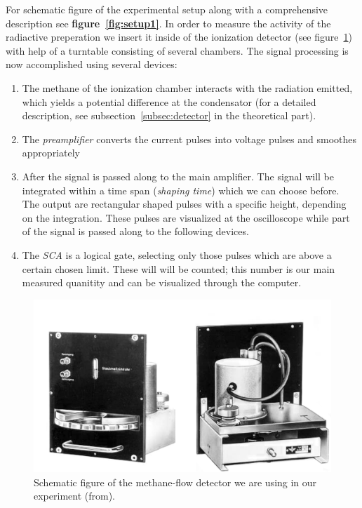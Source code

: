For schematic figure of the experimental setup along with a comprehensive
description see \textbf{figure~\ref{fig:setup1}}. In order to measure the activity of
the radiactive preperation we insert it inside of the ionization detector (see figure~\ref{fig:detector}) with
help of a turntable consisting of several chambers. The signal processing is now
accomplished using several devices: 
\begin{enumerate}
\item The methane of the ionization chamber 
interacts with the radiation emitted, which yields a potential difference
at the condensator (for a detailed description, 
see subsection~\ref{subsec:detector}
in the theoretical part).
\item The \textit{preamplifier} converts the current pulses into voltage pulses
and smoothes appropriately
\item After the signal is passed along to the main amplifier. The signal
will be integrated within a time span (\textit{shaping time}) which we can
choose before. The output are rectangular shaped pulses with a specific 
height, depending on the integration. These pulses are visualized at the
oscilloscope while part of the signal is passed along to the following devices.
\item The \textit{SCA} is a logical gate, selecting only those pulses which
are above a certain chosen limit. These will will be counted; this number is
our main measured quanitity and can be visualized through the computer.
\end{enumerate}
\begin{figure}[H]
    \centering
    \includegraphics[width=0.6\linewidth]{figures/detector}
    \caption{Schematic figure of the methane-flow detector we are using in our experiment (from\cite{ver}).
    }
    \label{fig:detector}
\end{figure}

